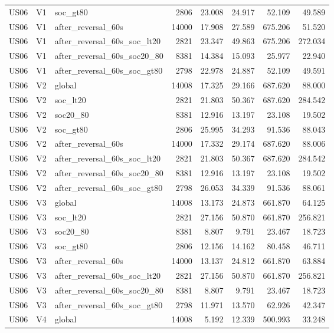 \begin{tabular}{lllrrrrr}
US06 & V1 & soc\_gt80 & 2806 & 23.008 & 24.917 & 52.109 & 49.589 \\
US06 & V1 & after\_reversal\_60s & 14000 & 17.908 & 27.589 & 675.206 & 51.520 \\
US06 & V1 & after\_reversal\_60s\_soc\_lt20 & 2821 & 23.347 & 49.863 & 675.206 & 272.034 \\
US06 & V1 & after\_reversal\_60s\_soc20\_80 & 8381 & 14.384 & 15.093 & 25.977 & 22.940 \\
US06 & V1 & after\_reversal\_60s\_soc\_gt80 & 2798 & 22.978 & 24.887 & 52.109 & 49.591 \\
US06 & V2 & global & 14008 & 17.325 & 29.166 & 687.620 & 88.000 \\
US06 & V2 & soc\_lt20 & 2821 & 21.803 & 50.367 & 687.620 & 284.542 \\
US06 & V2 & soc20\_80 & 8381 & 12.916 & 13.197 & 23.108 & 19.502 \\
US06 & V2 & soc\_gt80 & 2806 & 25.995 & 34.293 & 91.536 & 88.043 \\
US06 & V2 & after\_reversal\_60s & 14000 & 17.332 & 29.174 & 687.620 & 88.006 \\
US06 & V2 & after\_reversal\_60s\_soc\_lt20 & 2821 & 21.803 & 50.367 & 687.620 & 284.542 \\
US06 & V2 & after\_reversal\_60s\_soc20\_80 & 8381 & 12.916 & 13.197 & 23.108 & 19.502 \\
US06 & V2 & after\_reversal\_60s\_soc\_gt80 & 2798 & 26.053 & 34.339 & 91.536 & 88.061 \\
US06 & V3 & global & 14008 & 13.173 & 24.873 & 661.870 & 64.125 \\
US06 & V3 & soc\_lt20 & 2821 & 27.156 & 50.870 & 661.870 & 256.821 \\
US06 & V3 & soc20\_80 & 8381 & 8.807 & 9.791 & 23.467 & 18.723 \\
US06 & V3 & soc\_gt80 & 2806 & 12.156 & 14.162 & 80.458 & 46.711 \\
US06 & V3 & after\_reversal\_60s & 14000 & 13.137 & 24.812 & 661.870 & 63.884 \\
US06 & V3 & after\_reversal\_60s\_soc\_lt20 & 2821 & 27.156 & 50.870 & 661.870 & 256.821 \\
US06 & V3 & after\_reversal\_60s\_soc20\_80 & 8381 & 8.807 & 9.791 & 23.467 & 18.723 \\
US06 & V3 & after\_reversal\_60s\_soc\_gt80 & 2798 & 11.971 & 13.570 & 62.926 & 42.347 \\
US06 & V4 & global & 14008 & 5.192 & 12.339 & 500.993 & 33.248 \\

\end{tabular}
